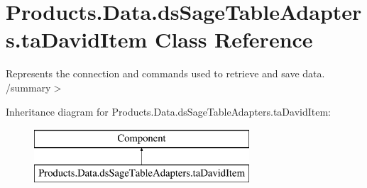 \hypertarget{class_products_1_1_data_1_1ds_sage_table_adapters_1_1ta_david_item}{}\section{Products.\+Data.\+ds\+Sage\+Table\+Adapters.\+ta\+David\+Item Class Reference}
\label{class_products_1_1_data_1_1ds_sage_table_adapters_1_1ta_david_item}


Represents the connection and commands used to retrieve and save data. /summary$>$  


Inheritance diagram for Products.\+Data.\+ds\+Sage\+Table\+Adapters.\+ta\+David\+Item\+:\begin{figure}[H]
\begin{center}
\leavevmode
\includegraphics[height=2.000000cm]{class_products_1_1_data_1_1ds_sage_table_adapters_1_1ta_david_item}
\end{center}
\end{figure}

